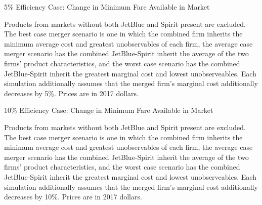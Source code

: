 \documentclass{article}
\begin{document}
\begin{appendices}
    \begin{table}
        \caption{5\% Efficiency Case: Change in Minimum Fare Available in Market}
        \label{tab:MinimumPrice_5}
                \vspace{-15mm}
        \begin{center}
            
        \end{center}
        \vspace{-5mm}
        \footnotesize{Products from markets without both JetBlue and Spirit present are excluded. The best case merger scenario is one in which the combined firm inherits the minimum average cost and greatest unobservables of each firm, the average case merger scenario has the combined JetBlue-Spirit inherit the average of the two firms' product characteristics, and the worst case scenario has the combined JetBlue-Spirit inherit the greatest marginal cost and lowest unobserveables. Each simulation additionally assumes that the merged firm's marginal cost additionally decreases by 5\%. Prices are in 2017 dollars.}
    \end{table}   

   \begin{table}
        \caption{10\% Efficiency Case: Change in Minimum Fare Available in Market}
        \label{tab:MinimumPrice_10}
                \vspace{-15mm}
        \begin{center}
            
        \end{center}
        \vspace{-5mm}
        \footnotesize{Products from markets without both JetBlue and Spirit present are excluded. The best case merger scenario is one in which the combined firm inherits the minimum average cost and greatest unobservables of each firm, the average case merger scenario has the combined JetBlue-Spirit inherit the average of the two firms' product characteristics, and the worst case scenario has the combined JetBlue-Spirit inherit the greatest marginal cost and lowest unobserveables. Each simulation additionally assumes that the merged firm's marginal cost additionally decreases by 10\%. Prices are in 2017 dollars.}
    \end{table}  
    
\pagebreak
\FloatBarrier

\end{appendices}
\end{document}
